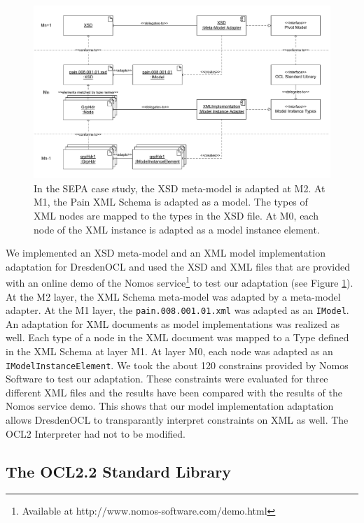\begin{figure}[tb]
	\centering
		\includegraphics[width=1.00\textwidth]{figures/casestudy02.pdf}
	\caption{In the SEPA case study, the XSD meta-model is adapted at M2. At M1, the Pain XML Schema is adapted as a model. The types of XML nodes are mapped to the types in the XSD file. At M0, each node of the XML instance is adapted as a model instance element.}
	\label{fig:casestudy02}
\end{figure}

We implemented an XSD meta-model and an XML model implementation adaptation 
for DresdenOCL and used the  XSD and XML files that are 
provided with an online demo of the Nomos service\footnote{Available at http://www.nomos-software.com/demo.html} 
to test our adaptation (see Figure \ref{fig:casestudy02}). At the M2 layer, 
the XML Schema meta-model was adapted by a meta-model adapter. At the M1 layer, 
the \texttt{pain.008.001.01.xml} was adapted as an \texttt{IModel}. An 
adaptation for XML documents as model implementations was realized as well. 
Each type of a node in the XML document was mapped to a Type defined in the 
XML Schema at layer M1. At layer M0, each node was adapted as an 
\texttt{IModelInstanceElement}. We took the  about 120 constrains
provided by Nomos Software to test our adaptation. These constraints were
evaluated for three different XML files and the results have been
 compared with the results of the Nomos service demo. This shows that our model
implementation adaptation allows DresdenOCL to transparantly interpret
constraints on XML as well. The OCL2 Interpreter had not to be
modified.


\subsection{The OCL2.2 Standard Library}

